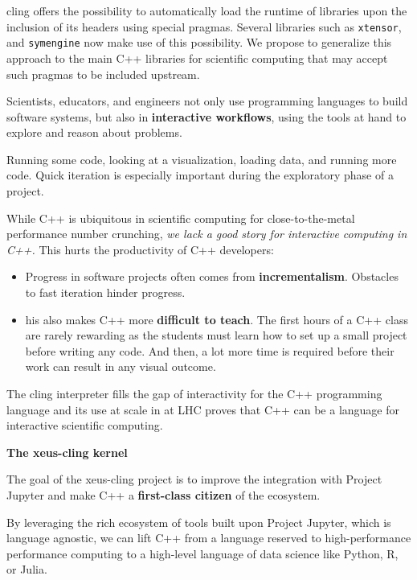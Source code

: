 \begin{task}[title=Interactive C++ in Jupyter with XEUS,
  id=xeus-cpp,
  lead=QS,
  PM=12,
  wphases={0-48},
  partners={QS,UPSUD}
]
\begin{compactenum}
  \begin{compactenum}
  \item
    cling offers the possibility to automatically load the runtime of
    libraries upon the inclusion of its headers using special pragmas.
    Several libraries such as \texttt{xtensor}, and \texttt{symengine}
    now make use of this possibility. We propose to generalize this
    approach to the main C++ libraries for scientific computing that may
    accept such pragmas to be included upstream.
  \end{compactenum}
\end{compactenum}

Scientists, educators, and engineers not only use programming languages
to build software systems, but also in \textbf{interactive workflows},
using the tools at hand to explore and reason about problems.

Running some code, looking at a visualization, loading data, and running
more code. Quick iteration is especially important during the
exploratory phase of a project.

While C++ is ubiquitous in scientific computing for close-to-the-metal
performance number crunching, \emph{we lack a good story for interactive
computing in C++.} This hurts the productivity of C++ developers:

\begin{itemize}
\item
  Progress in software projects often comes from
  \textbf{incrementalism}. Obstacles to fast iteration hinder progress.
\item
  his also makes C++ more \textbf{difficult to teach}. The first hours
  of a C++ class are rarely rewarding as the students must learn how to
  set up a small project before writing any code. And then, a lot more
  time is required before their work can result in any visual outcome.
\end{itemize}

The cling interpreter fills the gap of interactivity for the C++
programming language and its use at scale in at LHC proves that C++ can
be a language for interactive scientific computing.

\textbf{The xeus-cling kernel}

The goal of the xeus-cling project is to improve the integration with
Project Jupyter and make C++ a \textbf{first-class citizen} of the
ecosystem.

By leveraging the rich ecosystem of tools built upon Project Jupyter,
which is language agnostic, we can lift C++ from a language reserved to
high-performance performance computing to a high-level language of data
science like Python, R, or Julia.


\end{task}
